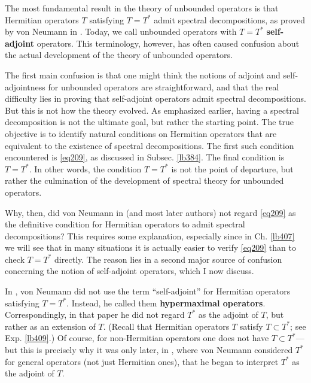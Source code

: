 \documentclass[12pt,b5paper,notitlepage]{article}
\theoremstyle{definition}
\theoremstyle{plain}
\numberwithin{equation}{section}
\begin{document}
The most fundamental result in the theory of unbounded operators is that Hermitian operators $T$ satisfying $T=T^*$ admit spectral decompositions, as proved by von Neumann in \cite{vN29a}. Today, we call unbounded operators with $T=T^*$ \textbf{self-adjoint} operators. This terminology, however, has often caused confusion about the actual development of the theory of unbounded operators.

The first main confusion is that one might think the notions of adjoint and self-adjointness for unbounded operators are straightforward, and that the real difficulty lies in proving that self-adjoint operators admit spectral decompositions. But this is not how the theory evolved. As emphasized earlier, having a spectral decomposition is not the ultimate goal, but rather the starting point. The true objective is to identify natural conditions on Hermitian operators that are equivalent to the existence of spectral decompositions. The first such condition encountered is \eqref{eq209}, as discussed in Subsec. \ref{lb384}. The final condition is  $T=T^*$. In other words, the condition $T=T^*$ is not the point of departure, but rather the culmination of the development of spectral theory for unbounded operators.

Why, then, did von Neumann in \cite{vN29a} (and most later authors) not regard \eqref{eq209} as the definitive condition for Hermitian operators to admit spectral decompositions? This requires some explanation, especially since in Ch. \ref{lb407} we will see that in many situations it is actually easier to verify \eqref{eq209} than to check $T=T^*$ directly. The reason lies in a second major source of confusion concerning the notion of self-adjoint operators, which I now discuss.



In \cite{vN29a}, von Neumann did not use the term ``self-adjoint'' for Hermitian operators satisfying $T=T^*$. Instead, he called them \textbf{hypermaximal operators}. Correspondingly, in that paper he did not regard $T^*$ as the adjoint of $T$, but rather as an extension of $T$. (Recall that Hermitian operators $T$ satisfy $T\subset T^*$; see Exp. \ref{lb409}.) Of course, for non-Hermitian operators one does not have $T\subset T^*$---but this is precisely why it was only later, in \cite{vN32b}, where von Neumann considered $T^*$ for general operators (not just Hermitian ones), that he began to interpret $T^*$ as the adjoint of $T$. 
\end{document}
